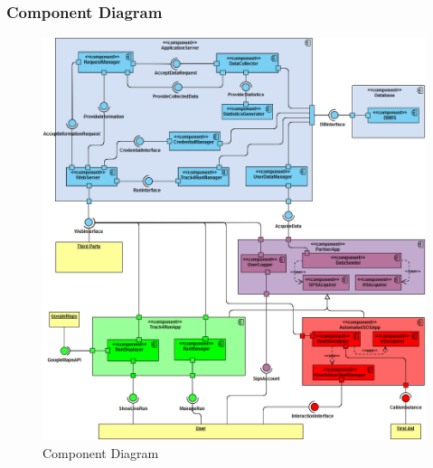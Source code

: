\subsubsection{Component Diagram}
\begin{figure}[H]
\centering
\includegraphics[scale=0.7]{Images/ComponentDiagram.png}
\caption{Component Diagram}
\end{figure}

